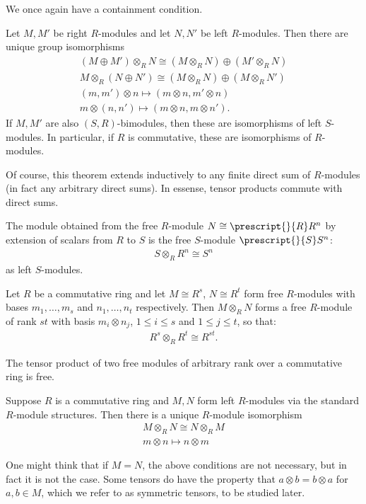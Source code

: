 \documentclass{memoir}
\begin{document}
We once again have a containment condition.

\begin{thm}
	Let \(M, M'\) be right \(R\)-modules and let \(N, N'\) be left \(R\)-modules. Then there are unique group isomorphisms
	\begin{align*}
		(M \oplus M') \otimes_R N \cong (M \otimes_R N) \oplus (M' \otimes_R N)\\
		M \otimes_R (N \oplus N') \cong (M \otimes_R N) \oplus (M \otimes_R N')\\
		(m,m') \otimes n \mapsto (m \otimes n, m' \otimes n)\\
		m \otimes(n,n') \mapsto (m \otimes n, m \otimes n').
	\end{align*}
	If \(M,M'\) are also \((S,R)\)-bimodules, then these are isomorphisms of left \(S\)-modules. In particular, if \(R\) is commutative, these are isomorphisms of \(R\)-modules.
\end{thm}
Of course, this theorem extends inductively to any finite direct sum of \(R\)-modules (in fact any arbitrary direct sums). In essense, tensor products commute with direct sums.

\begin{cor}
	The module obtained from the free \(R\)-module \(N \cong \prescript{}{R}R^{n}\) by extension of scalars from \(R\) to \(S\) is the free \(S\)-module \(\prescript{}{S}S^{n}\):
	\begin{align*}
		S \otimes_R R^{n} \cong S^{n}
	\end{align*}
as left \(S\)-modules.
\end{cor}

\begin{cor}
	Let \(R\) be a commutative ring and let \(M \cong R^{s}\), \(N \cong R^{t}\) form free \(R\)-modules with bases \(m_1,\ldots,m_s\) and \(n_1,\ldots,n_t\) respectively.  Then \(M \otimes_R N\) forms a free \(R\)-module of rank \(st\) with basis \(m_i \otimes n_j\), \(1\leq i\leq s\) and \(1\leq j\leq t\), so that:
	\begin{align*}
		R^{s} \otimes_R R^{t} \cong R^{st}.
	\end{align*}
\end{cor}

\begin{rmrk}
	The tensor product of two free modules of arbitrary rank over a commutative ring is free.
\end{rmrk}

\begin{prop}
	Suppose \(R\) is a commutative ring and \(M,N\) form left \(R\)-modules via the standard \(R\)-module structures. Then there is a unique \(R\)-module isomorphism
	\begin{align*}
		M \otimes_R N \cong N \otimes_R M\\
		m \otimes n \mapsto n \otimes m
	\end{align*}
\end{prop}
One might think that if \(M=N\), the above conditions are not necessary, but in fact it is not the case. Some tensors do have the property that \(a \otimes b = b \otimes a\) for \(a,b \in M\), which we refer to as symmetric tensors, to be studied later.
\end{document}
